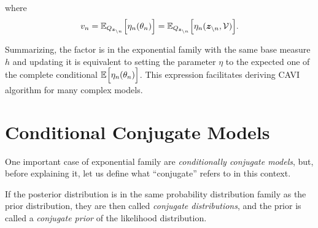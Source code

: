 where
\[
  v_{n} = \mathbb{E}_{Q_{\bm{z}_{\backslash n}}}\Big[\eta_{n}(\theta_{n})\Big] =  \mathbb{E}_{Q_{\bm{z}_{\backslash n}}}\Big[\eta_{n}(\bm{z}_{\backslash n}, \mathcal{V})\Big].
\]

Summarizing, the factor is in the exponential family with the same base measure \(h\) and updating it is equivalent to setting the parameter \(\eta\) to the expected one of the complete conditional \(\mathbb{E}_{}\Big[\eta_{n}(\theta_{n})\Big]\). This expression facilitates deriving CAVI algorithm for many complex models.

\section{Conditional Conjugate Models}

One important case of exponential family are \emph{conditionally conjugate models}, but, before explaining it, let us define what ``conjugate'' refers to in this context.

\begin{definition}
If the posterior distribution is in the same probability distribution family as
the prior distribution, they are then called \emph{conjugate distributions}, and
the prior is called a \emph{conjugate prior} of the likelihood distribution.
\end{definition}

